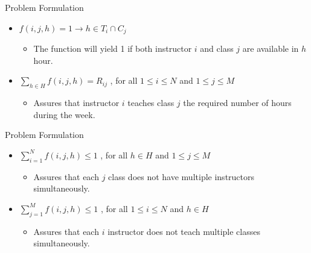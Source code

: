 \documentclass[14pt, aspectratio=169]{beamer}
\begin{document}
\begin{frame}{Problem Formulation}
    \begin{itemize}
        \item $f(i,j,h) = 1 \xrightarrow{} h \in T_{i} \cap C_{j}$
              \vspace{2mm}
              \begin{itemize}
                  \item The function will yield 1 if both instructor $i$ and class $j$ are available in $h$ hour.
              \end{itemize}
              \vspace{2mm}

        \item \(\sum\limits_{h \in H} f(i,j,h) = R_{ij} \) , for all $1 \leq i \leq N$ and $1 \leq j \leq M$
              \vspace{2mm}
              \begin{itemize}
                  \item Assures that instructor $i$ teaches class $j$ the required number of hours during the week.
              \end{itemize}
              \vspace{2mm}
    \end{itemize}
\end{frame}
\begin{frame}{Problem Formulation}
    \begin{itemize}
        \item \( \sum\limits_{i=1}^{N} f(i,j,h) \leq 1 \) , for all $h \in H$ and $1 \leq j \leq M$
              \vspace{2mm}
              \begin{itemize}
                  \item Assures that each $j$ class does not have multiple instructors simultaneously.
              \end{itemize}
              \vspace{2mm}

        \item \( \sum\limits_{j=1}^{M} f(i,j,h) \leq 1 \) , for all $1 \leq i \leq N$ and $h \in H$
              \vspace{2mm}
              \begin{itemize}
                  \item Assures that each $i$ instructor does not teach multiple classes simultaneously.
              \end{itemize}
    \end{itemize}
\end{frame}
\end{document}
